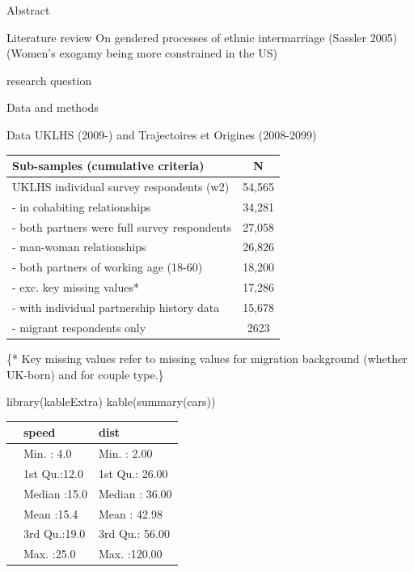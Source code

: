 \documentclass[
  ignorenonframetext,
]{beamer}
\newenvironment{Shaded}{\begin{snugshade}}{\end{snugshade}}
\newcommand{\FunctionTok}[1]{\textcolor[rgb]{0.28,0.35,0.67}{#1}}
\newcommand{\NormalTok}[1]{\textcolor[rgb]{0.00,0.23,0.31}{#1}}
\begin{document}
\begin{frame}{Abstract}
\begin{block}{Literature review}
On gendered processes of ethnic intermarriage (Sassler 2005) (Women's
exogamy being more constrained in the US)
\end{block}

\begin{block}{research question}
\protect\hypertarget{research-question}{}
\end{block}
\end{frame}

\begin{frame}[fragile]{Data and methods}
\protect\hypertarget{data-and-methods}{}
\begin{block}{Data}
\protect\hypertarget{data}{}
UKLHS (2009-) and Trajectoires et Origines (2008-2099)

\begin{center}
\footnotesize
\begin{tabular}{lc}
  \hline
 \textbf{Sub-samples (cumulative criteria)} & \textbf{N} \\ 
  \hline
  UKLHS individual survey respondents (w2) & 54,565 \\ 
  - in cohabiting relationships & 34,281 \\
  - both partners were full survey respondents & 27,058 \\
  - man-woman relationships & 26,826     \\ 
  - both partners of working age (18-60) & 18,200 \\
  - exc. key missing values* & 17,286 \\
  - with individual partnership history data & 15,678 \\
  - migrant respondents only & 2623 \\
 \hline
\end{tabular}
\end{center}

\scriptsize\{* Key missing values refer to missing values for migration
background (whether UK-born) and for couple type.\}

\begin{Shaded}
\begin{Highlighting}[]
\FunctionTok{library}\NormalTok{(kableExtra)}
\FunctionTok{kable}\NormalTok{(}\FunctionTok{summary}\NormalTok{(cars))}
\end{Highlighting}
\end{Shaded}

\begin{tabular}{l|l|l}
\hline
  &     speed &      dist\\
\hline
 & Min.   : 4.0 & Min.   :  2.00\\
\hline
 & 1st Qu.:12.0 & 1st Qu.: 26.00\\
\hline
 & Median :15.0 & Median : 36.00\\
\hline
 & Mean   :15.4 & Mean   : 42.98\\
\hline
 & 3rd Qu.:19.0 & 3rd Qu.: 56.00\\
\hline
 & Max.   :25.0 & Max.   :120.00\\
\hline
\end{tabular}


\end{block}
\end{frame}
\end{document}
